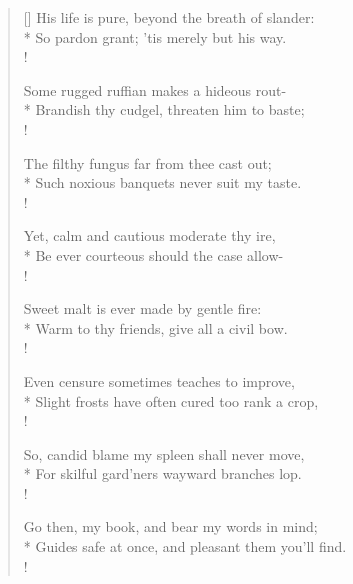 \begin{verse}[\versewidth]
His life is pure, beyond the breath of slander:\\*
So pardon grant; 'tis merely but his way.\\!

Some rugged ruffian makes a hideous rout-\\*
Brandish thy cudgel, threaten him to baste;\\!

The filthy fungus far from thee cast out;\\*
Such noxious banquets never suit my taste.\\!

Yet, calm and cautious moderate thy ire,\\*
Be ever courteous should the case allow-\\!

Sweet malt is ever made by gentle fire:\\*
Warm to thy friends, give all a civil bow.\\!

Even censure sometimes teaches to improve,\\*
Slight frosts have often cured too rank a crop,\\!

So, candid blame my spleen shall never move,\\*
For skilful gard'ners wayward branches lop.\\!

Go then, my book, and bear my words in mind;\\*
Guides safe at once, and pleasant them you'll find.\\!
\end{verse}

